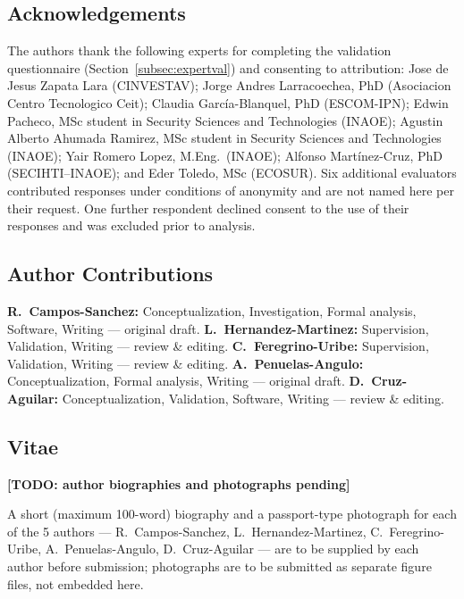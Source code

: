 \documentclass[preprint,12pt,authoryear]{elsarticle}
\newcommand{\ph}[1]{\textbf{\textcolor{phbg}{[TODO: #1]}}}
\begin{document}
\subsection*{Acknowledgements}
The authors thank the following experts for completing the validation questionnaire (Section~\ref{subsec:expertval}) and consenting to attribution: Jose de Jesus Zapata Lara (CINVESTAV); Jorge Andres Larracoechea, PhD (Asociacion Centro Tecnologico Ceit); Claudia Garc\'{i}a-Blanquel, PhD (ESCOM-IPN); Edwin Pacheco, MSc student in Security Sciences and Technologies (INAOE); Agustin Alberto Ahumada Ramirez, MSc student in Security Sciences and Technologies (INAOE); Yair Romero Lopez, M.Eng.\ (INAOE); Alfonso Mart\'{i}nez-Cruz, PhD (SECIHTI--INAOE); and Eder Toledo, MSc (ECOSUR). Six additional evaluators contributed responses under conditions of anonymity and are not named here per their request. One further respondent declined consent to the use of their responses and was excluded prior to analysis.

\subsection*{Author Contributions}
\textbf{R.~Campos-Sanchez:} Conceptualization, Investigation, Formal analysis, Software, Writing --- original draft.
\textbf{L.~Hernandez-Martinez:} Supervision, Validation, Writing --- review \& editing.
\textbf{C.~Feregrino-Uribe:} Supervision, Validation, Writing --- review \& editing.
\textbf{A.~Penuelas-Angulo:} Conceptualization, Formal analysis, Writing --- original draft.
\textbf{D.~Cruz-Aguilar:} Conceptualization, Validation, Software, Writing --- review \& editing.

\subsection*{Vitae}
\ph{author biographies and photographs pending}

A short (maximum 100-word) biography and a passport-type photograph for each of the 5 authors --- R.~Campos-Sanchez, L.~Hernandez-Martinez, C.~Feregrino-Uribe, A.~Penuelas-Angulo, D.~Cruz-Aguilar --- are to be supplied by each author before submission; photographs are to be submitted as separate figure files, not embedded here.



\end{document}
